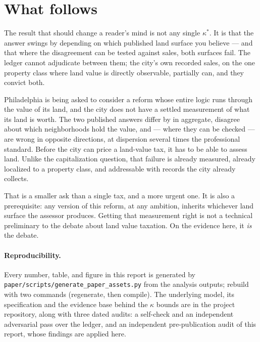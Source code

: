 \documentclass[11pt]{article}
\begin{document}
\section{What follows}

The result that should change a reader's mind is not any single $\kappa^*$. It is that the
answer swings by \StxSpanSurface{} depending on which published land surface you believe ---
and that where the disagreement can be tested against sales, both surfaces fail. The ledger
cannot adjudicate between them; the city's own recorded sales, on the one property class where
land value is directly observable, partially can, and they convict both.

Philadelphia is being asked to consider a reform whose entire logic runs through the value of
its land, and the city does not have a settled measurement of what its land is worth. The two
published answers differ by \StxSurfaceGapPct{} in aggregate, disagree about which
neighborhoods hold the value, and --- where they can be checked --- are wrong in opposite
directions, at dispersion several times the professional standard. Before the city can price a
land-value tax, it has to be able to assess land. Unlike the capitalization question, that
failure is already measured, already localized to a property class, and addressable with
records the city already collects.

That is a smaller ask than a single tax, and a more urgent one. It is also a prerequisite: any
version of this reform, at any ambition, inherits whichever land surface the assessor produces.
Getting that measurement right is not a technical preliminary to the debate about land value
taxation. On the evidence here, it \emph{is} the debate.

\paragraph{Reproducibility.} Every number, table, and figure in this report is generated by
\texttt{paper/scripts/generate\_paper\_assets.py} from the analysis outputs; rebuild with two commands (regenerate, then compile). The underlying model, its specification and the
evidence base behind the $\kappa$ bounds are in the project repository, along with three dated
audits: a self-check and an independent adversarial pass over the ledger, and an independent
pre-publication audit of this report, whose findings are applied here.
\end{document}
